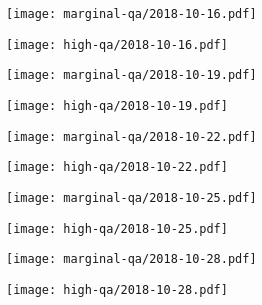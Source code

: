 \documentclass{article}
\begin{document}
\begin{figure}[H]
	\ContinuedFloat
	\centering
	\begin{subfigure}{0.48\linewidth}
		\texttt{[image: marginal-qa/2018-10-16.pdf]}
	\end{subfigure}
	\begin{subfigure}{0.48\linewidth}
		\texttt{[image: high-qa/2018-10-16.pdf]}
	\end{subfigure}
	\begin{subfigure}{0.48\linewidth}
		\texttt{[image: marginal-qa/2018-10-19.pdf]}
	\end{subfigure}
	\begin{subfigure}{0.48\linewidth}
		\texttt{[image: high-qa/2018-10-19.pdf]}
	\end{subfigure}
	\begin{subfigure}{0.48\linewidth}
		\texttt{[image: marginal-qa/2018-10-22.pdf]}
	\end{subfigure}
	\begin{subfigure}{0.48\linewidth}
		\texttt{[image: high-qa/2018-10-22.pdf]}
	\end{subfigure}
	\begin{subfigure}{0.48\linewidth}
		\texttt{[image: marginal-qa/2018-10-25.pdf]}
	\end{subfigure}
	\begin{subfigure}{0.48\linewidth}
		\texttt{[image: high-qa/2018-10-25.pdf]}
	\end{subfigure}
	\begin{subfigure}{0.48\linewidth}
		\texttt{[image: marginal-qa/2018-10-28.pdf]}
	\end{subfigure}
	\begin{subfigure}{0.48\linewidth}
		\texttt{[image: high-qa/2018-10-28.pdf]}
	\end{subfigure}
\end{figure}
\end{document}
